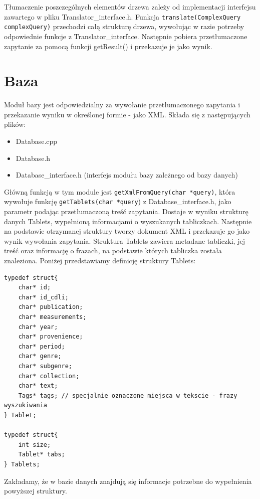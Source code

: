 Tłumaczenie poszczególnych elementów drzewa zależy od implementacji interfejsu zawartego w pliku Translator\_interface.h. 
Funkcja \verb|translate(ComplexQuery complexQuery)| przechodzi całą strukturę drzewa, wywołując w razie 
potrzeby odpowiednie funkcje z Translator\_interface.
Następnie pobiera przetłumaczone zapytanie za pomocą funkcji getResult() i przekazuje je jako wynik.

\section{Baza}
Moduł bazy jest odpowiedzialny za wywołanie przetłumaczonego zapytania i przekazanie wyniku w określonej formie - jako XML.
Składa się z następujących plików:
\begin {itemize}
 \item Database.cpp
 \item Database.h
 \item Database\_interface.h (interfejs modułu bazy zależnego od bazy danych)
\end {itemize}

Główną funkcją w tym module jest \verb|getXmlFromQuery(char *query)|, która
wywołuje funkcję \verb|getTablets(char *query|) z Database\_interface.h, jako parametr podając przetłumaczoną treść zapytania. 
Dostaje w wyniku strukturę danych Tablets, wypełnioną informacjami o wyszukanych tabliczkach.
Następnie na podstawie otrzymanej struktury tworzy dokument XML i przekazuje go jako wynik wywołania zapytania.
\newline
Struktura Tablets zawiera metadane tabliczki, jej treść oraz informację o frazach, na podstawie których tabliczka została znaleziona. 
Poniżej przedstawiamy definicję struktury Tablets:
\begin{verbatim}
typedef struct{    
    char* id;
    char* id_cdli;
    char* publication;
    char* measurements;
    char* year;
    char* provenience;
    char* period;
    char* genre;
    char* subgenre;
    char* collection;
    char* text;
    Tags* tags; // specjalnie oznaczone miejsca w tekscie - frazy wyszukiwania
} Tablet;

typedef struct{
    int size;
    Tablet* tabs;
} Tablets;
\end{verbatim}

Zakładamy, że w bazie danych znajdują się informacje potrzebne do wypełnienia powyższej struktury.


